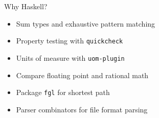 \documentclass{beamer}
\begin{document}
\begin{frame}{Why Haskell?}
\begin{itemize}
    \item Sum types and exhaustive pattern matching
    \item Property testing with \texttt{quickcheck}
    \item Units of measure with \texttt{uom-plugin}
    \item Compare floating point and rational math
    \item Package \texttt{fgl} for shortest path
    \item Parser combinators for file format parsing
\end{itemize}
\end{frame}
\end{document}
